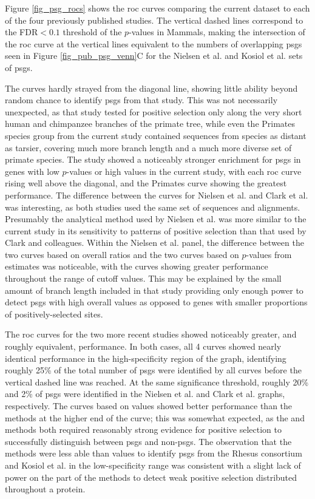 Figure \ref{fig_psg_rocs} shows the \ac{roc} curves comparing the
current dataset to each of the four previously published studies. The
vertical dashed lines correspond to the FDR$<0.1$ threshold of the
\psgeone $p$-values in Mammals, making the intersection of the
\psgeone \ac{roc} curve at the vertical lines equivalent to the
numbers of overlapping \acp{psg} seen in Figure
\ref{fig_pub_psg_venn}C for the Nielsen et
al. \citeyearpar{Nielsen2005} and Kosiol et
al. \citeyearpar{Kosiol2008} sets of \acp{psg}.

The \citet{Clark2003} curves hardly strayed from the diagonal line,
showing little ability beyond random chance to identify \acp{psg} from
that study. This was not necessarily unexpected, as that study tested
for positive selection only along the very short human and chimpanzee
branches of the primate tree, while even the Primates species group
from the current study contained sequences from species as distant as
tarsier, covering much more branch length and a much more diverse set
of primate species. The \citet{Nielsen2005} study
showed a noticeably stronger enrichment for \acp{psg} in genes with
low $p$-values or high \dnds values in the current study, with each
\ac{roc} curve rising well above the diagonal, and the Primates \dnds
curve showing the greatest performance. The difference between the
curves for Nielsen et al. and Clark et al. was interesting, as both
studies used the same set of sequences and alignments. Presumably the
analytical method used by Nielsen et al. was more similar to the
current study in its sensitivity to patterns of positive selection
than that used by Clark and colleagues. Within the Nielsen et
al. panel, the difference between the two curves based on overall
\dnds ratios and the two curves based on $p$-values from \sw estimates
was noticeable, with the \dnds curves showing greater performance
throughout the range of cutoff values. This may be explained by the
small amount of branch length included in that study providing only
enough power to detect \acp{psg} with high overall \dnds values as
opposed to genes with smaller proportions of positively-selected
sites.

The \ac{roc} curves for the two more recent studies showed noticeably
greater, and roughly equivalent, performance. In both cases, all 4
curves showed nearly identical performance in the high-specificity
region of the graph, identifying roughly 25\% of the total number of
\acp{psg} were identified by all curves before the vertical dashed
line was reached. At the same significance threshold, roughly 20\% and
2\% of \acp{psg} were identified in the Nielsen et al. and Clark et
al. graphs, respectively. The curves based on \dnds values showed
better performance than the \sw methods at the higher end of the
curve; this was somewhat expected, as the \psgeone and \psghoch
methods both required reasonably strong \sw evidence for positive
selection to successfully distinguish between \acp{psg} and
non-\acp{psg}. The observation that the \sw methods were less able
than \dnds values to identify \acp{psg} from the Rhesus consortium and
Kosiol et al. in the low-specificity range was consistent with a
slight lack of power on the part of the \sw methods to detect weak
positive selection distributed throughout a protein.

